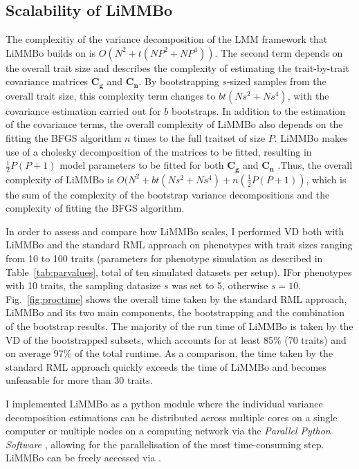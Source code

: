 \subsection{Scalability of LiMMBo}
The complexitiy of the variance decomposition of the LMM framework that LiMMBo builds on is \(O(N^2 + t(NP^2 + NP^4))\). The second term depends on the overall trait size and describes the complexity of estimating the trait-by-trait covariance matrices $\mathbf{C_g}$ and $\mathbf{C_n}$. By bootstrapping \(s\)-sized samples from the overall trait size, this complexity term changes to \(bt(Ns^2 + Ns^4)\), with the covariance estimation carried out for \(b\) bootstraps. In addition to the estimation of the covariance terms, the overall complexity of LiMMBo also depends on the fitting the BFGS algorithm \(n\) times to the full traitset of size \(P\). LiMMBo makes use of a cholesky decomposition of the matrices to be fitted, resulting in $\frac{1}{2}P(P+1)$ model parameters to be fitted for both $\mathbf{C_g}$ and $\mathbf{C_n}$ .Thus, the overall complexity of LiMMBo is \(O(N^2 + bt(Ns^2 + Ns^4) + n(\frac{1}{2}P(P+1))\), which is the sum of the complexity of the bootstrap variance decompositions and the complexity of fitting the BFGS algorithm.  

In order to assess and compare how LiMMBo scales, I performed VD both with LiMMBo and the standard RML approach on phenotypes with trait sizes ranging from 10 to 100 traits (parameters for phenotype simulation as described in Table~\ref{tab:parvalues}, total of ten simulated datasets per setup). IFor phenotypes with 10 traits, the sampling datasize \(s\) was set to 5, otherwise  \(s=10\).  Fig.~\ref{fig:proctime} shows the overall time taken by the standard RML approach, LiMMBo and its two main components, the bootstrapping and the combination of the bootstrap results. The majority of the run time of LiMMBo is taken by the VD of the bootstrapped subsets, which accounts for at least 85\%  (70 traits) and on average 97\%  of the total runtime. As a comparison, the time taken by the standard RML approach quickly exceeds the time of LiMMBo and becomes unfeasable for more than 30 traits. 

I implemented LiMMBo as a python module where the individual variance decomposition estimations can be distributed across multiple cores on a single computer or multiple nodes on a computing network via the \textit{Parallel Python Software} \cite{PPSoftware}, allowing for the parallelisation of the most time-consuming step. LiMMBo can be freely accessed via .


